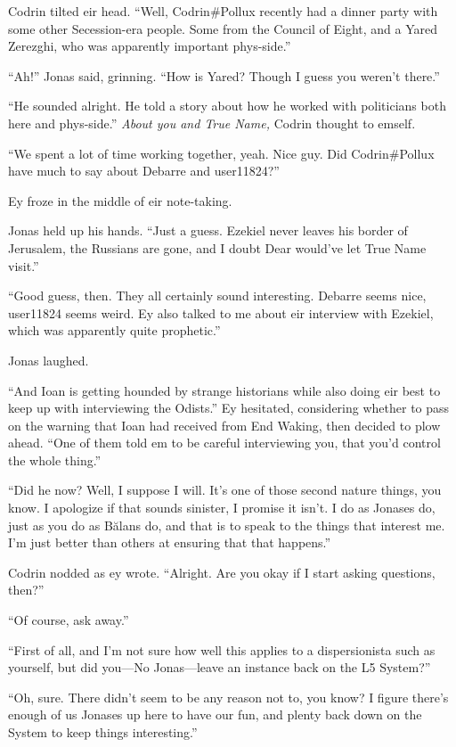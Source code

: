 Codrin tilted eir head. ``Well, Codrin\#Pollux recently had a dinner party with some other Secession-era people. Some from the Council of Eight, and a Yared Zerezghi, who was apparently important phys-side.''

``Ah!'' Jonas said, grinning. ``How is Yared? Though I guess you weren't there.''

``He sounded alright. He told a story about how he worked with politicians both here and phys-side.'' \emph{About you and True Name,} Codrin thought to emself.

``We spent a lot of time working together, yeah. Nice guy. Did Codrin\#Pollux have much to say about Debarre and user11824?''

Ey froze in the middle of eir note-taking.

Jonas held up his hands. ``Just a guess. Ezekiel never leaves his border of Jerusalem, the Russians are gone, and I doubt Dear would've let True Name visit.''

``Good guess, then. They all certainly sound interesting. Debarre seems nice, user11824 seems weird. Ey also talked to me about eir interview with Ezekiel, which was apparently quite prophetic.''

Jonas laughed.

``And Ioan is getting hounded by strange historians while also doing eir best to keep up with interviewing the Odists.'' Ey hesitated, considering whether to pass on the warning that Ioan had received from End Waking, then decided to plow ahead. ``One of them told em to be careful interviewing you, that you'd control the whole thing.''

``Did he now? Well, I suppose I will. It's one of those second nature things, you know. I apologize if that sounds sinister, I promise it isn't. I do as Jonases do, just as you do as Bălans do, and that is to speak to the things that interest me. I'm just better than others at ensuring that that happens.''

Codrin nodded as ey wrote. ``Alright. Are you okay if I start asking questions, then?''

``Of course, ask away.''

``First of all, and I'm not sure how well this applies to a dispersionista such as yourself, but did you---No Jonas---leave an instance back on the L5 System?''

``Oh, sure. There didn't seem to be any reason not to, you know? I figure there's enough of us Jonases up here to have our fun, and plenty back down on the System to keep things interesting.''

